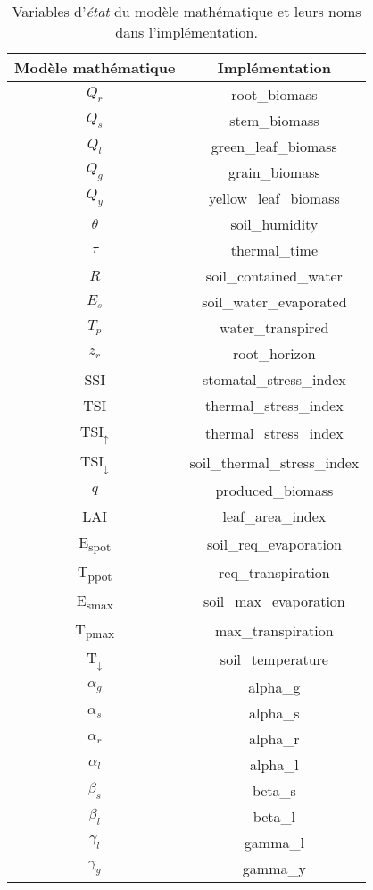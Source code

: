 
\begin{table}[H]
  \centering
  \begin{tabular}{|c|c|}
    \hline
    \textbf{Modèle mathématique} & \textbf{Implémentation} \\
    \hline
    $Q_r$ & root\_biomass \\
    $Q_s$ & stem\_biomass \\
    $Q_l$ & green\_leaf\_biomass \\
    $Q_g$ & grain\_biomass \\
    $Q_y$ & yellow\_leaf\_biomass \\
    $\theta$ & soil\_humidity \\
    $\tau$ & thermal\_time \\
    $R$ & soil\_contained\_water \\
    $E_s$ & soil\_water\_evaporated \\
    $T_p$ & water\_transpired \\
    $z_r$ & root\_horizon \\
    SSI & stomatal\_stress\_index \\
    TSI & thermal\_stress\_index \\
    TSI$_{\uparrow}$ & thermal\_stress\_index \\
    TSI$_{\downarrow}$ & soil\_thermal\_stress\_index \\
    $q$ & produced\_biomass \\
    LAI & leaf\_area\_index \\
    E\textsubscript{spot} & soil\_req\_evaporation \\
    T\textsubscript{ppot} & req\_transpiration \\
    E\textsubscript{smax} & soil\_max\_evaporation \\
    T\textsubscript{pmax} & max\_transpiration \\
    T$_{\downarrow}$ & soil\_temperature \\
    $\alpha_g$ & alpha\_g \\
    $\alpha_s$ & alpha\_s \\
    $\alpha_r$ & alpha\_r \\
    $\alpha_l$ & alpha\_l \\
    $\beta_s$ & beta\_s \\
    $\beta_l$ & beta\_l \\
    $\gamma_l$ & gamma\_l \\
    $\gamma_y$ & gamma\_y \\
    \hline
    \end{tabular}
  \caption{Variables d'\emph{état} du modèle mathématique et leurs noms
  dans l'implémentation.}
  \label{table:state_var}
\end{table}

